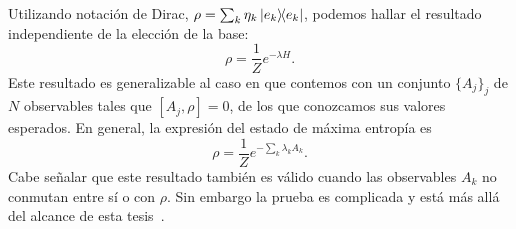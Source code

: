 Utilizando notación de Dirac, $\rho=\sum_{k}\eta_{k}\dyad{e_{k}}$, podemos hallar el resultado independiente de la elección de la base:
\begin{equation}
    \rho=\frac{1}{Z}e^{-\lambda H}.
\end{equation}
Este resultado es generalizable al caso en que contemos con un  conjunto $\{A_{j}\}_{j}$ de $N$ observables tales que $[A_{j},\rho]=0$, de los que conozcamos sus valores esperados. En general, la expresión del estado de máxima entropía es
\begin{equation}\label{eq:GeneralMaxEnt}
    \rho=\frac{1}{Z}e^{-\sum_{k}\lambda_{k} A_{k}}.
\end{equation}
Cabe señalar que este resultado también es válido cuando las observables $A_k$ no conmutan entre sí o con $\rho$. Sin embargo la prueba es complicada y está más allá del alcance de esta tesis~\cite{FormalJaynes,Wichmann1963}.